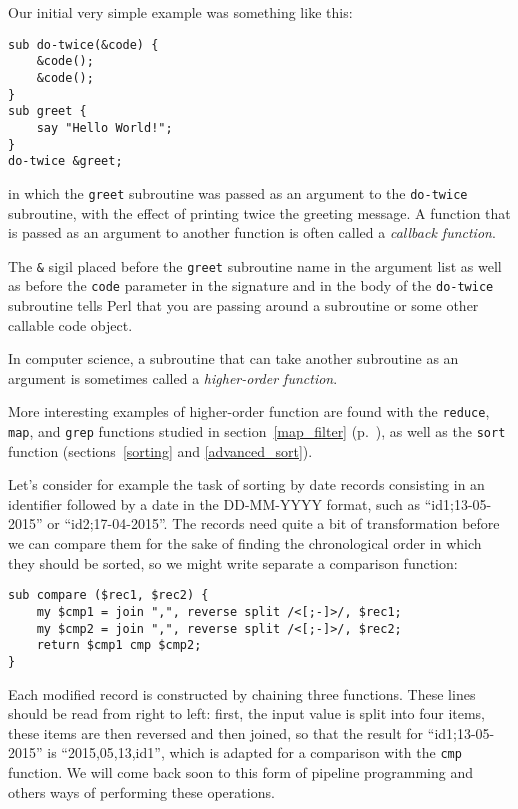 Our initial very simple example was something 
like this:

\begin{verbatim}
sub do-twice(&code) {
    &code(); 
    &code();
}
sub greet {
    say "Hello World!";
}
do-twice &greet;
\end{verbatim}

in which the {\tt greet} subroutine was passed as an 
argument to the {\tt do-twice} subroutine, with the 
effect of printing twice the greeting message. A 
function that is passed as an argument to another function 
is often called a \emph{callback function}.

The \verb"&" sigil placed before the {\tt greet} 
subroutine name in the argument list as well as before 
the {\tt code} parameter in the signature and in the 
body of the {\tt do-twice} subroutine tells Perl 
that you are passing around a subroutine or some 
other callable code object.
\ifplastex \else
{}
\fi

In computer science, a subroutine that can take 
another subroutine as an argument is sometimes 
called a \emph{higher-order function}.

More interesting examples of higher-order function 
are found with the {\tt reduce}, {\tt map}, and
{\tt grep} functions studied in section~\ref{map_filter} 
(p.~\pageref{map_filter}), as well as the {\tt sort} 
function (sections~\ref{sorting} and \ref{advanced_sort}).

Let's consider for example the task of sorting by date 
records consisting in an identifier followed by a date 
in the DD-MM-YYYY format, such as ``id1;13-05-2015'' 
or ``id2;17-04-2015''. The records need quite a bit of 
transformation before we can compare them for the sake 
of finding the chronological order in which they should 
be sorted, so we might write separate a comparison 
function:

\begin{verbatim}
sub compare ($rec1, $rec2) {
    my $cmp1 = join ",", reverse split /<[;-]>/, $rec1;
    my $cmp2 = join ",", reverse split /<[;-]>/, $rec2;
    return $cmp1 cmp $cmp2;
}   
\end{verbatim}

Each modified record is constructed by chaining three 
functions. These lines should be read from right to left: 
first, the input value is split into four items, these 
items are then reversed and then joined, so that the result 
for ``id1;13-05-2015'' is ``2015,05,13,id1'', which is 
adapted for a comparison with the {\tt cmp} function. We 
will come back soon to this form of pipeline programming 
and others ways of performing these operations. 

